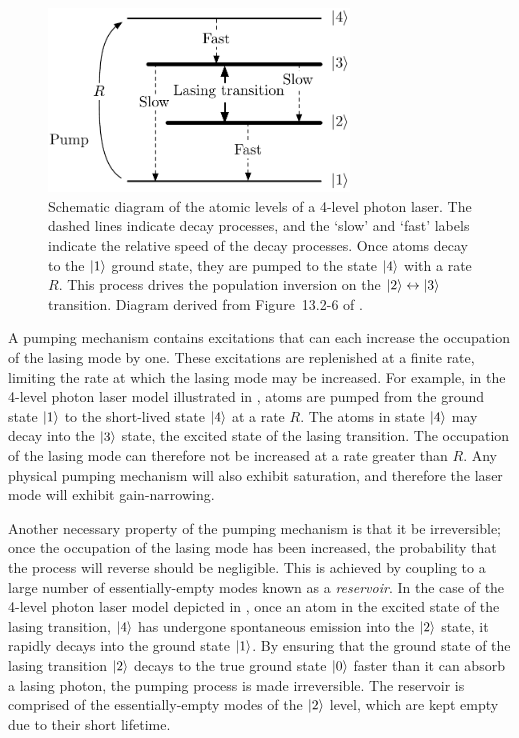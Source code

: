 \begin{figure}
    \centering
    \includegraphics[width=8cm]{4LevelOpticalLaserModel}
    \caption{
        \label{Introduction:4LevelOpticalLaserModel}
        Schematic diagram of the atomic levels of a 4-level photon laser.  The dashed lines indicate decay processes, and the `slow' and `fast' labels indicate the relative speed of the decay processes.  Once atoms decay to the ${\left|1\right>}$ ground state, they are pumped to the state ${\left|4\right>}$ with a rate $R$.  This process drives the population inversion on the ${\left|2\right>} \leftrightarrow{\ensuremath{\left|3\right>}}$ transition.  Diagram derived from Figure~13.2-6 of \citet{SalehTeich}.
    }
\end{figure}

A pumping mechanism contains excitations that can each increase the occupation of the lasing mode by one.  These excitations are replenished at a finite rate, limiting the rate at which the lasing mode may be increased.  For example, in the 4-level photon laser model illustrated in , atoms are pumped from the ground state ${\left|1\right>}$ to the short-lived state ${\left|4\right>}$ at a rate $R$.  The atoms in state ${\left|4\right>}$ may decay into the ${\left|3\right>}$ state, the excited state of the lasing transition.  The occupation of the lasing mode can therefore not be increased at a rate greater than $R$.  Any physical pumping mechanism will also exhibit saturation, and therefore the laser mode will exhibit gain-narrowing.

Another necessary property of the pumping mechanism is that it be irreversible; once the occupation of the lasing mode has been increased, the probability that the process will reverse should be negligible.  This is achieved by coupling to a large number of essentially-empty modes known as a \emph{reservoir}.  In the case of the 4-level photon laser model depicted in , once an atom in the excited state of the lasing transition, ${\left|4\right>}$ has undergone spontaneous emission into the ${\left|2\right>}$ state, it rapidly decays into the ground state ${\left|1\right>}$.  By ensuring that the ground state of the lasing transition ${\left|2\right>}$ decays to the true ground state ${\left|0\right>}$ faster than it can absorb a lasing photon, the pumping process is made irreversible.  The reservoir is comprised of the essentially-empty modes of the ${\left|2\right>}$ level, which are kept empty due to their short lifetime.

